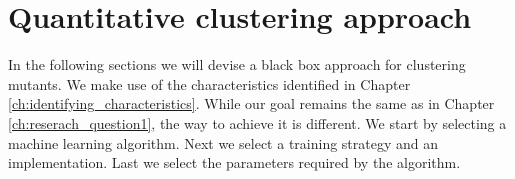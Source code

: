 \documentclass[../main]{subfiles}
\begin{document}
\chapter{Quantitative clustering approach}
\label{ch:reserach_question2}
In the following sections we will devise a black box approach for clustering mutants.
We make use of the characteristics identified in Chapter \ref{ch:identifying_characteristics}.
While our goal remains the same as in Chapter \ref{ch:reserach_question1}, the way to achieve it is different.
We start by selecting a machine learning algorithm.
Next we select a training strategy and an implementation.
Last we select the parameters required by the algorithm.


\end{document}
